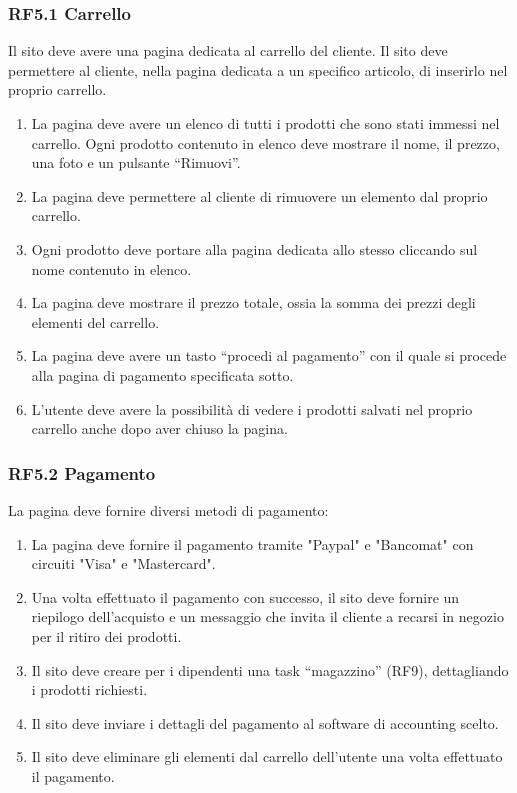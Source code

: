 \documentclass{report}
\begin{document}
\subsubsection{RF5.1 Carrello}
Il sito deve avere una pagina dedicata al carrello del cliente.
Il sito deve permettere al cliente, nella pagina dedicata a un specifico articolo, di inserirlo nel proprio carrello.

\begin{enumerate}
	\item La pagina deve avere un elenco di tutti i prodotti che sono stati immessi nel carrello. Ogni prodotto contenuto in elenco deve mostrare il nome, il prezzo, una foto e un pulsante “Rimuovi”.
	
	\item La pagina deve permettere al cliente di rimuovere un elemento dal proprio carrello. %

	\item Ogni prodotto deve portare alla pagina dedicata allo stesso cliccando sul nome contenuto in elenco.
	
	\item La pagina deve mostrare il prezzo totale, ossia la somma dei prezzi degli elementi del carrello.

	\item La pagina deve avere un tasto “procedi al pagamento” con il quale si procede alla pagina di pagamento specificata sotto.
	
	\item L'utente deve avere la possibilità di vedere i prodotti salvati nel proprio carrello anche dopo aver chiuso la pagina.

\end{enumerate}

\subsubsection*{RF5.2 Pagamento}
La pagina deve fornire diversi metodi di pagamento:

\begin{enumerate}

	\item La pagina deve fornire il pagamento tramite "Paypal" e "Bancomat" con circuiti "Visa" e "Mastercard".

	\item Una volta effettuato il pagamento con successo, il sito deve fornire un riepilogo dell’acquisto e un messaggio che invita il cliente a recarsi in negozio per il ritiro dei prodotti.
	\item Il sito deve creare per i dipendenti una task “magazzino” (RF9), dettagliando i prodotti richiesti.
	\item Il sito deve inviare i dettagli del pagamento al software di accounting scelto.
	\item Il sito deve eliminare gli elementi dal carrello dell’utente una volta effettuato il pagamento.
\end{enumerate}
\end{document}
